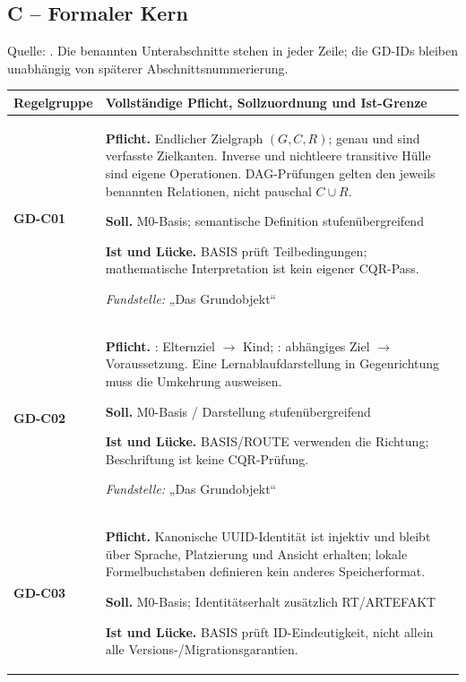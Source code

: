\subsection{C -- Formaler Kern}
Quelle: . Die benannten Unterabschnitte stehen in jeder Zeile; die GD-IDs bleiben unabhängig von späterer Abschnittsnummerierung.

\begingroup\small
\begin{longtable}{@{}P{20mm}P{128mm}@{}}
\toprule
Regelgruppe & Vollständige Pflicht, Sollzuordnung und Ist-Grenze\\
\midrule\endhead
{}\label{rule:GD-C01}\textbf{GD-C01} &
\textbf{Pflicht.} Endlicher Zielgraph \((G,C,R)\); genau  und  sind verfasste Zielkanten. Inverse und nichtleere transitive Hülle sind eigene Operationen. DAG-Prüfungen gelten den jeweils benannten Relationen, nicht pauschal \(C\cup R\).\par\smallskip
\textbf{Soll.} M0-Basis; semantische Definition stufenübergreifend\par\smallskip
\textbf{Ist und Lücke.} BASIS prüft Teilbedingungen; mathematische Interpretation ist kein eigener CQR-Pass.\par\smallskip
\emph{Fundstelle:} „Das Grundobjekt“\\\addlinespace[5pt]
\label{rule:GD-C02}\textbf{GD-C02} &
\textbf{Pflicht.} : Elternziel \ensuremath{\to} Kind; : abhängiges Ziel \ensuremath{\to} Voraussetzung. Eine Lernablaufdarstellung in Gegenrichtung muss die Umkehrung ausweisen.\par\smallskip
\textbf{Soll.} M0-Basis / Darstellung stufenübergreifend\par\smallskip
\textbf{Ist und Lücke.} BASIS/ROUTE verwenden die Richtung; Beschriftung ist keine CQR-Prüfung.\par\smallskip
\emph{Fundstelle:} „Das Grundobjekt“\\\addlinespace[5pt]
\label{rule:GD-C03}\textbf{GD-C03} &
\textbf{Pflicht.} Kanonische UUID-Identität ist injektiv und bleibt über Sprache, Platzierung und Ansicht erhalten; lokale Formelbuchstaben definieren kein anderes Speicherformat.\par\smallskip
\textbf{Soll.} M0-Basis; Identitätserhalt zusätzlich RT/ARTEFAKT\par\smallskip
\textbf{Ist und Lücke.} BASIS prüft ID-Eindeutigkeit, nicht allein alle Versions-/Migrationsgarantien.\par\smallskip

\end{longtable}
